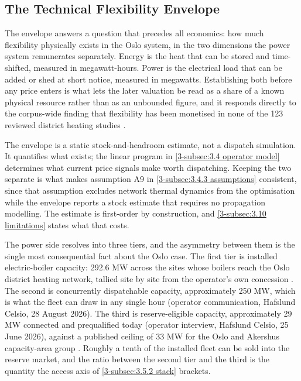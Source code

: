 \subsection{The Technical Flexibility Envelope}
\label{3-subsec:3.3 technical envelope}

The envelope answers a question that precedes all economics: how much flexibility physically exists in the Oslo system, in the two dimensions the power system remunerates separately. Energy is the heat that can be stored and time-shifted, measured in megawatt-hours. Power is the electrical load that can be added or shed at short notice, measured in megawatts. Establishing both before any price enters is what lets the later valuation be read as a share of a known physical resource rather than as an unbounded figure, and it responds directly to the corpus-wide finding that flexibility has been monetised in none of the 123 reviewed district heating studies \cite{ahmed_district_2025}.

The envelope is a static stock-and-headroom estimate, not a dispatch simulation. It quantifies what exists; the linear program in \autoref{3-subsec:3.4 operator model} determines what current price signals make worth dispatching. Keeping the two separate is what makes assumption A9 in \autoref{3-subsec:3.4.3 assumptions} consistent, since that assumption excludes network thermal dynamics from the optimisation while the envelope reports a stock estimate that requires no propagation modelling. The estimate is first-order by construction, and \autoref{3-subsec:3.10 limitations} states what that costs.

The power side resolves into three tiers, and the asymmetry between them is the single most consequential fact about the Oslo case. The first tier is installed electric-boiler capacity: 292.6 MW across the sites whose boilers reach the Oslo district heating network, tallied site by site from the operator's own concession \cite{nve_konsesjonssak_2026}. The second is concurrently dispatchable capacity, approximately 250 MW, which is what the fleet can draw in any single hour (operator communication, Hafslund Celsio, 28 August 2026). The third is reserve-eligible capacity, approximately 29 MW connected and prequalified today (operator interview, Hafslund Celsio, 25 June 2026), against a published ceiling of 33 MW for the Oslo and Akershus capacity-area group \cite{statnett_innforing_2026}. Roughly a tenth of the installed fleet can be sold into the reserve market, and the ratio between the second tier and the third is the quantity the access axis of \autoref{3-subsec:3.5.2 stack} brackets.


